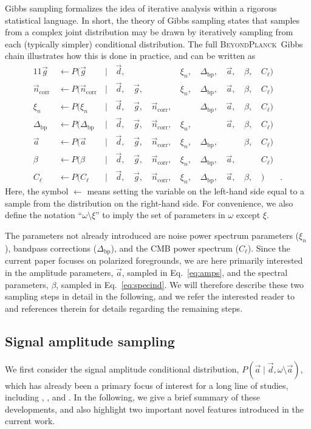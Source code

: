 \documentclass[twocolumn]{aa}
\renewcommand{\d}[0]{\vec{d}}
\newcommand{\n}[0]{\vec{n}}
\renewcommand{\a}[0]{\vec{a}}
\newcommand{\g}[0]{\vec{g}}
\newcommand{\Dbp}[0]{\Delta_{\mathrm{bp}}}
\newcommand{\BP}{\textsc{BeyondPlanck}}
\newcommand{\?}[1]{\textcolor{red}{{\bf [#1]}}}
\begin{document}
Gibbs sampling formalizes the idea of iterative analysis within a rigorous
statistical language. In short, the theory of Gibbs sampling states that samples
from a complex joint distribution may be drawn by iteratively sampling from each
(typically simpler) conditional distribution. The full \BP\ Gibbs chain
\citep{bp01} illustrates how this is done in practice, and can be written as
\begin{alignat}{11}
\g &\,\leftarrow P(\g&\,\mid&\,\d,&\, & &\,\xi_n, &\,\Dbp, &\,\a, &\,\beta, &\,C_{\ell})\\
\n_{\mathrm{corr}} &\,\leftarrow P(\n_{\mathrm{corr}}&\,\mid&\,\d, &\,\g, &\,&\,\xi_n, &\,\Dbp, &\,\a, &\,\beta, &\,C_{\ell})\\
\xi_n &\,\leftarrow P(\xi_n&\,\mid&\,\d, &\,\g, &\,\n_{\mathrm{corr}}, &\,&\,\Dbp, &\,\a, &\,\beta, &\,C_{\ell})\\
\Dbp &\,\leftarrow P(\Dbp&\,\mid&\,\d, &\,\g, &\,\n_{\mathrm{corr}}, &\,\xi_n, &\,&\,\a, &\,\beta, &\,C_{\ell})\\
\a &\,\leftarrow P(\a&\,\mid&\,\d, &\,\g, &\,\n_{\mathrm{corr}}, &\,\xi_n, &\,\Dbp, &\,&\,\beta, &\,C_{\ell})\label{eq:amps}\\
\beta &\,\leftarrow P(\beta&\,\mid&\,\d, &\,\g, &\,\n_{\mathrm{corr}}, &\,\xi_n, &\,\Dbp, &\,\a,&\,&\,C_{\ell}) \label{eq:specind}\\
C_\ell &\,\leftarrow P(C_\ell&\,\mid&\,\d, &\,\g, &\,\n_{\mathrm{corr}}, &\,\xi_n, &\,\Dbp,&\,\a, &\,\beta, &\,)&.
\end{alignat}
Here, the symbol $\leftarrow$ means setting the variable on the left-hand side
equal to a sample from the distribution on the right-hand side. For convenience,
we also define the notation ``$\omega\setminus \xi$'' to imply the set of
parameters in $\omega$ except $\xi$.

The parameters not already introduced are noise power spectrum
parameters ($\xi_n$),
bandpass corrections ($\Dbp$), and the CMB power spectrum
($C_{\ell}$). Since the current paper focuses on polarized
foregrounds, we are here primarily interested in the amplitude
parameters, $\a$, sampled in Eq.~\eqref{eq:amps}, and the spectral
parameters, $\beta$, sampled in Eq.~\eqref{eq:specind}. We will
therefore describe these two sampling steps in detail in the
following, and we refer the interested reader to \citet{bp01} and
references therein for details regarding the remaining steps.

\subsection{Signal amplitude sampling}
We first consider the signal amplitude conditional distribution,
$P(\a\mid\d, \omega\setminus\a)$, which has already been a primary
focus of interest for a long line of studies, including
\citet{jewell2004}, \citet{eriksen:2004, eriksen2008}, and
\citet{seljebotn:2019}. In the following, we give a brief summary of
these developments, and also highlight two important novel features
introduced in the current work.
\end{document}
